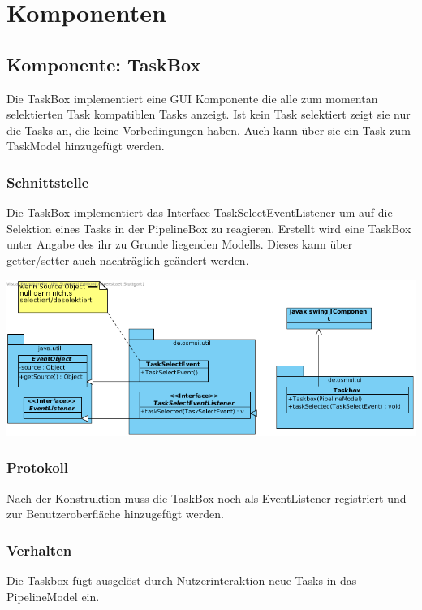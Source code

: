 \documentclass[a4paper,12pt]{scrartcl}
\begin{document}

\section{Komponenten}
\subsection{Komponente: TaskBox}
Die TaskBox implementiert eine GUI Komponente die alle zum momentan selektierten Task kompatiblen Tasks anzeigt. Ist kein Task selektiert zeigt sie nur die Tasks an, die keine Vorbedingungen haben. Auch kann über sie ein Task zum TaskModel hinzugefügt werden.
\subsubsection{Schnittstelle}
Die TaskBox implementiert das Interface TaskSelectEventListener um auf die Selektion eines Tasks in der PipelineBox zu reagieren. Erstellt wird eine TaskBox unter Angabe des ihr zu Grunde liegenden Modells. Dieses kann über getter/setter auch nachträglich geändert werden.
\begin{center}
\includegraphics[width=17cm]{Schnittstelle_TaskBox.png}
\end{center}
\subsubsection{Protokoll}
Nach der Konstruktion muss die TaskBox noch als EventListener registriert und zur Benutzeroberfläche hinzugefügt werden.
\subsubsection{Verhalten}
Die Taskbox fügt ausgelöst durch Nutzerinteraktion neue Tasks in das PipelineModel ein.
\end{document}
